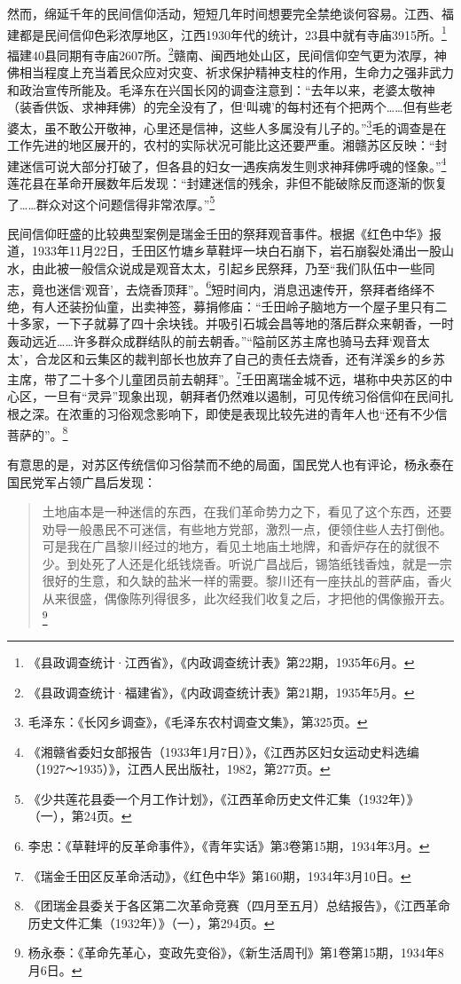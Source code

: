 然而，绵延千年的民间信仰活动，短短几年时间想要完全禁绝谈何容易。江西、福建都是民间信仰色彩浓厚地区，江西1930年代的统计，23县中就有寺庙3915所。\footnote{《县政调查统计·江西省》，《内政调查统计表》第22期，1935年6月。}福建40县同期有寺庙2607所。\footnote{《县政调查统计·福建省》，《内政调查统计表》第21期，1935年5月。}赣南、闽西地处山区，民间信仰空气更为浓厚，神佛相当程度上充当着民众应对灾变、祈求保护精神支柱的作用，生命力之强非武力和政治宣传所能及。毛泽东在兴国长冈的调查注意到：“去年以来，老婆太敬神（装香供饭、求神拜佛）的完全没有了，但‘叫魂’的每村还有个把两个……但有些老婆太，虽不敢公开敬神，心里还是信神，这些人多属没有儿子的。”\footnote{毛泽东：《长冈乡调查》，《毛泽东农村调查文集》，第325页。}毛的调查是在工作先进的地区展开的，农村的实际状况可能比这还要严重。湘赣苏区反映：“封建迷信可说大部分打破了，但各县的妇女一遇疾病发生则求神拜佛呼魂的怪象。”\footnote{《湘赣省委妇女部报告（1933年1月7日）》，《江西苏区妇女运动史料选编（1927～1935）》，江西人民出版社，1982，第277页。}莲花县在革命开展数年后发现：“封建迷信的残余，非但不能破除反而逐渐的恢复了……群众对这个问题信得非常浓厚。”\footnote{《少共莲花县委一个月工作计划》，《江西革命历史文件汇集（1932年）》（一），第24页。}


民间信仰旺盛的比较典型案例是瑞金壬田的祭拜观音事件。根据《红色中华》报道，1933年11月22日，壬田区竹塘乡草鞋坪一块白石崩下，岩石崩裂处涌出一股山水，由此被一般信众说成是观音太太，引起乡民祭拜，乃至“我们队伍中一些同志，竟也迷信‘观音’，去烧香顶拜”。\footnote{李忠：《草鞋坪的反革命事件》，《青年实话》第3卷第15期，1934年3月。}短时间内，消息迅速传开，祭拜者络绎不绝，有人还装扮仙童，出卖神签，募捐修庙：“壬田岭子脑地方一个屋子里只有二十多家，一下子就募了四十余块钱。并吸引石城会昌等地的落后群众来朝香，一时轰动远近……许多群众成群结队的前去朝香。”“隘前区苏主席也骑马去拜‘观音太太’，合龙区和云集区的裁判部长也放弃了自己的责任去烧香，还有洋溪乡的乡苏主席，带了二十多个儿童团员前去朝拜”。\footnote{《瑞金壬田区反革命活动》，《红色中华》第160期，1934年3月10日。}壬田离瑞金城不远，堪称中央苏区的中心区，一旦有“灵异”现象出现，朝拜者仍然难以遏制，可见传统习俗信仰在民间扎根之深。在浓重的习俗观念影响下，即使是表现比较先进的青年人也“还有不少信菩萨的”。\footnote{《团瑞金县委关于各区第二次革命竞赛（四月至五月）总结报告》，《江西革命历史文件汇集（1932年）》（一），第294页。}


有意思的是，对苏区传统信仰习俗禁而不绝的局面，国民党人也有评论，杨永泰在国民党军占领广昌后发现：

\begin{quote}

土地庙本是一种迷信的东西，在我们革命势力之下，看见了这个东西，还要劝导一般愚民不可迷信，有些地方党部，激烈一点，便领住些人去打倒他。可是我在广昌黎川经过的地方，看见土地庙土地牌，和香炉存在的就很不少。到处死了人还是化纸钱烧香。听说广昌战后，锡箔纸钱香烛，就是一宗很好的生意，和久缺的盐米一样的需要。黎川还有一座扶乩的菩萨庙，香火从来很盛，偶像陈列得很多，此次经我们收复之后，才把他的偶像搬开去。\footnote{杨永泰：《革命先革心，变政先变俗》，《新生活周刊》第1卷第15期，1934年8月6日。}
\end{quote}


